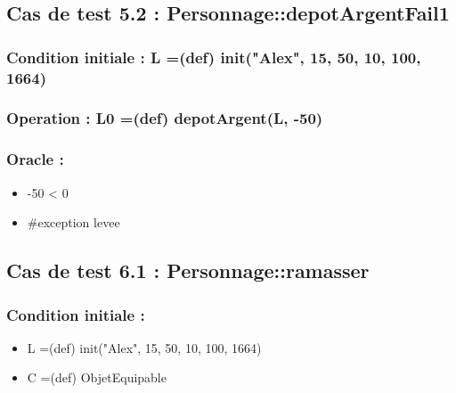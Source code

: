 \documentclass[11pt]{article}
\begin{document}
\subsection{Cas de test 5.2 : Personnage::depotArgentFail1}
\label{sec-1.14}

\subsubsection{Condition initiale :  L =(def) init("Alex", 15, 50, 10, 100, 1664)}
\label{sec-1.14.1}

\subsubsection{Operation : L0 =(def) depotArgent(L, -50)}
\label{sec-1.14.2}

\subsubsection{Oracle :}
\label{sec-1.14.3}

\begin{itemize}

\item -50 < 0\\
\label{sec-1.14.3.1}


\item \#exception levee\\
\label{sec-1.14.3.2}




\end{itemize} %
\subsection{Cas de test 6.1 : Personnage::ramasser}
\label{sec-1.15}

\subsubsection{Condition initiale :}
\label{sec-1.15.1}

\begin{itemize}

\item L =(def) init("Alex", 15, 50, 10, 100, 1664)\\
\label{sec-1.15.1.1}


\item C =(def) ObjetEquipable\\
\label{sec-1.15.1.2}

\end{itemize} %
\end{document}
